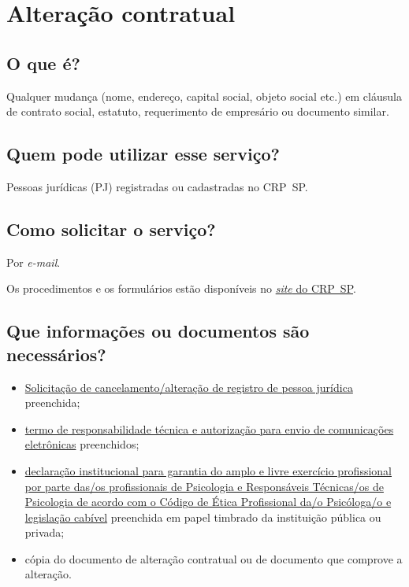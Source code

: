 \chapter{Alteração contratual}
\label{chap:pj-alteracao}


\section{O que é?}

Qualquer mudança (nome, endereço, capital social, objeto social etc.) em cláusula de contrato social, estatuto, requerimento de empresário ou documento similar.

\section{Quem pode utilizar esse serviço?}

Pessoas jurídicas (PJ) registradas ou cadastradas no CRP~SP.

\section{Como solicitar o serviço?}

Por \emph{e-mail}.

Os procedimentos e os formulários estão disponíveis no \href{https://www.crpsp.org/pagina/view/320}{\emph{site} do CRP~SP}.

\section{Que informações ou documentos são necessários?}

\begin{itemize}
  \item  \hyperref[]{Solicitação  de cancelamento/alteração de registro de pessoa jurídica} preenchida;
  \item  \hyperref[]{termo  de responsabilidade técnica e autorização para envio de comunicações  eletrônicas} preenchidos;
  \item  \hyperref[]{declaração  institucional para garantia do amplo e livre exercício profissional  por parte das/os profissionais de Psicologia e Responsáveis  Técnicas/os de Psicologia de acordo com o Código de Ética Profissional  da/o Psicóloga/o e legislação cabível} preenchida em papel timbrado da  instituição pública ou privada;
  \item  cópia do documento de alteração contratual ou de documento que  comprove a alteração.
\end{itemize}

